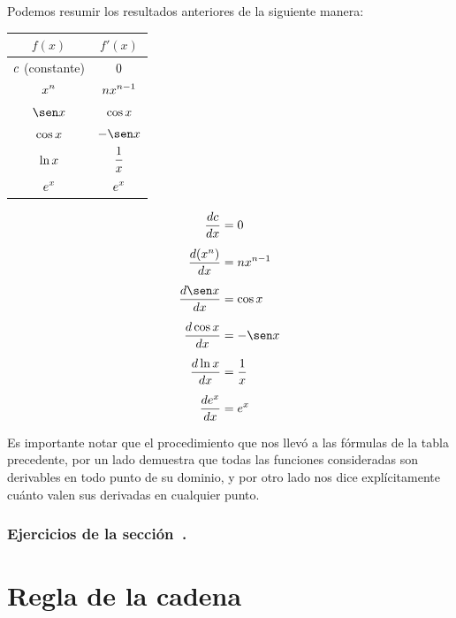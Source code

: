 Podemos resumir los resultados anteriores de la siguiente manera:

\noindent\hfil
\begin{minipage}{.4\textwidth}
\def\arraystretch{1.8}
\begin{tabular}{|c|c|}
    \hline
    $f(x)$ & $f'(x)$ \\
    \hline\hline
    $\displaystyle c$ (constante) 
    & $\displaystyle 0$
    \\ \hline
    $\displaystyle x^n$ 
    & $\displaystyle nx^{n-1}$
    \\ \hline
    $\D \sen x$ 
    & $\displaystyle \cos x$
    \\ \hline
    $\displaystyle \cos x$ 
    & $\D -\sen x$
    \\ \hline
    $\displaystyle \ln x$ 
    & $\displaystyle \frac1x$
    \\ \hline
    $\displaystyle e^x$ 
    & $\displaystyle e^x$
    \\ \hline
\end{tabular}
\end{minipage}
\hfil
\begin{minipage}{.4\textwidth}
\begin{align*}
    \frac{dc}{dx} &= 0 \\[5pt]
    \frac{d(x^n)}{dx} &= n x^{n-1}\\[5pt]
    \frac{d\sen x }{dx } &= \cos x  \\[5pt]
    \frac{d \cos x}{dx } &= -\sen x  \\[5pt]
    \frac{d\ln x }{dx } &=  \frac1x \\[5pt]
    \frac{d e^x}{dx } &= e^x
\end{align*}
\end{minipage}

Es importante notar que el procedimiento que nos llevó a las fórmulas de la tabla precedente, por un lado demuestra que todas las funciones consideradas son derivables en todo punto de su dominio, y por otro lado nos dice explícitamente cuánto valen sus derivadas en cualquier punto.

\subsubsection*{Ejercicios de la sección~.}

\begin{enumerate}

\end{enumerate}


\section{Regla de la cadena}

